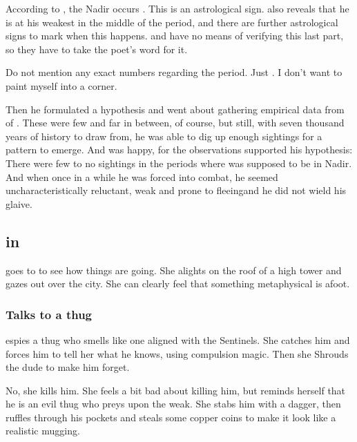 According to \WanderersInDarknessEmph, the Nadir occurs . 
This is an astrological sign. 
\WanderersInDarknessEmph also reveals that he is at his weakest in the middle of the period, and there are further astrological signs to mark when this happens. 
\Teshrial{} and \Lothagiel{} have no means of verifying this last part, so they have to take the poet's word for it. 

Do not mention any exact numbers regarding the period. 
Just . 
I don't want to paint myself into a corner.

Then he formulated a hypothesis and went about gathering empirical data from  of \Ishnaruchaefir. 
These were few and far in between, of course, but still, with seven thousand years of history to draw from, he was able to dig up enough sightings for a pattern to emerge. 
And \Lothagiel{} was happy, for the observations supported his hypothesis: 
There were few to no sightings in the periods where \Ishnaruchaefir{} was supposed to be in Nadir. 
And when once in a while he was forced into combat, he seemed uncharacteristically reluctant, weak and prone to fleeing\dash and he did not wield his glaive. 










\subsection{\Criseis in \Malcur}
\Criseis{} goes to \Malcur to see how things are going. 
She alights on the roof of a high tower and gazes out over the city. 
She can clearly feel that something metaphysical is afoot. 





\subsubsection{Talks to a thug}
\Criseis{} espies a thug who smells like one aligned with the Sentinels. 
She catches him and forces him to tell her what he knows, using compulsion magic. 
Then she Shrouds the dude to make him forget. 

No, she kills him. 
She feels a bit bad about killing him, but reminds herself that he is an evil thug who preys upon the weak. 
She stabs him with a dagger, then ruffles through his pockets and steals some copper coins to make it look like a realistic mugging. 

